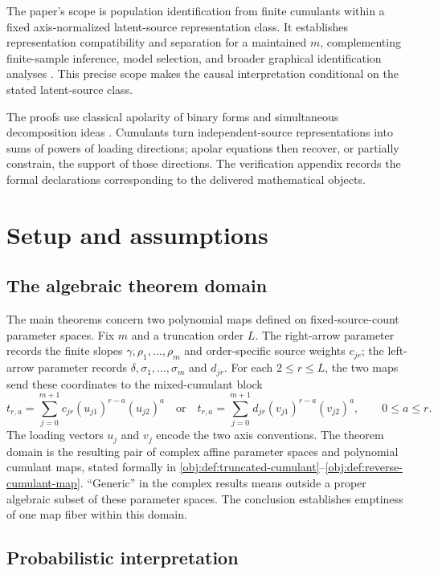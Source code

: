 \documentclass[11pt]{article}
\begin{document}
The paper's scope is population identification from finite cumulants within a fixed axis-normalized latent-source representation class. It establishes representation compatibility and separation for a maintained \(m\), complementing finite-sample inference, model selection, and broader graphical identification analyses \citep{Pearl2009,SpirtesGlymourScheines2001,PetersJanzingScholkopf2017,RichardsonSpirtes2002}. This precise scope makes the causal interpretation conditional on the stated latent-source class.

The proofs use classical apolarity of binary forms and simultaneous decomposition ideas \citep{ComonMourrain1996,Landsberg2012}. Cumulants turn independent-source representations into sums of powers of loading directions; apolar equations then recover, or partially constrain, the support of those directions. The verification appendix records the formal declarations corresponding to the delivered mathematical objects.


\section{Setup and assumptions}

\subsection{The algebraic theorem domain}

The main theorems concern two polynomial maps defined on fixed-source-count parameter spaces. Fix \(m\) and a truncation order \(L\). The right-arrow parameter records the finite slopes \(\gamma,\rho_1,\ldots,\rho_m\) and order-specific source weights \(c_{jr}\); the left-arrow parameter records \(\delta,\sigma_1,\ldots,\sigma_m\) and \(d_{jr}\). For each \(2\le r\le L\), the two maps send these coordinates to the mixed-cumulant block
\[
t_{r,a}
=\sum_{j=0}^{m+1}c_{jr}(u_{j1})^{r-a}(u_{j2})^a
\quad\text{or}\quad
t_{r,a}
=\sum_{j=0}^{m+1}d_{jr}(v_{j1})^{r-a}(v_{j2})^a,
\qquad 0\le a\le r.
\]
The loading vectors \(u_j\) and \(v_j\) encode the two axis conventions. The theorem domain is the resulting pair of complex affine parameter spaces and polynomial cumulant maps, stated formally in \cref{obj:def:truncated-cumulant}--\cref{obj:def:reverse-cumulant-map}. ``Generic'' in the complex results means outside a proper algebraic subset of these parameter spaces. The conclusion establishes emptiness of one map fiber within this domain.

\subsection{Probabilistic interpretation}
\end{document}

